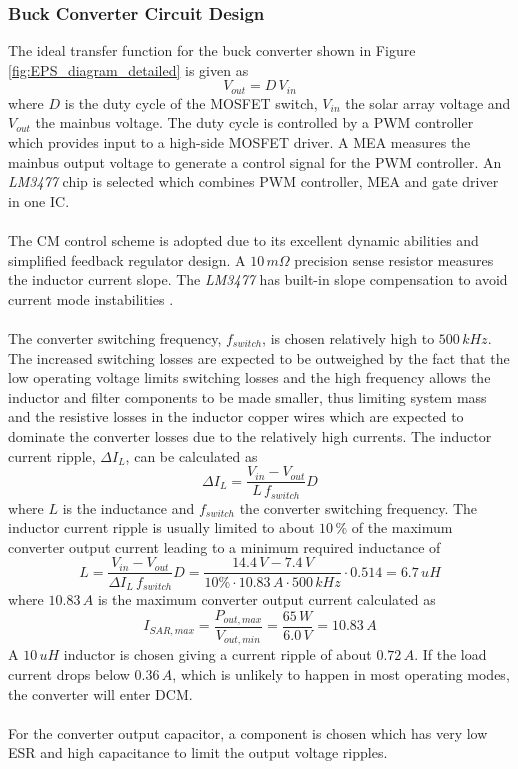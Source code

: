 \subsubsection{Buck Converter Circuit Design}
The ideal transfer function for the buck converter shown in Figure \ref{fig:EPS_diagram_detailed} is given as
%
\begin{equation}
V_{out}=D\,V_{in}
\end{equation}
%
where $D$ is the duty cycle of the \ac{MOSFET} switch, $V_{in}$ the solar array voltage and $V_{out}$ the mainbus voltage. The duty cycle is controlled by a \ac{PWM} controller which provides input to a high-side \ac{MOSFET} driver. A \ac{MEA} measures the mainbus output voltage to generate a control signal for the PWM controller. An \textit{LM3477} chip is selected which combines \ac{PWM} controller, \ac{MEA} and gate driver in one \ac{IC}.
\\
\\
The \ac{CM} control scheme is adopted due to its excellent dynamic abilities \cite[sec. 12-3-6]{Fundamentals} and simplified feedback regulator design. A $10\,m \Omega$ precision sense resistor measures the inductor current slope. The \textit{LM3477} has built-in slope compensation to avoid current mode instabilities \cite[sec. 12-1]{Fundamentals}.
\\
\\
The converter switching frequency, $f_{switch}$, is chosen relatively high to $500\,kHz$. The increased switching losses are expected to be outweighed by the fact that the low operating voltage limits switching losses and the high frequency allows the inductor and filter components to be made smaller, thus limiting system mass and the resistive losses in the inductor copper wires which are expected to dominate the converter losses due to the relatively high currents. The inductor current ripple, $\Delta I_L$, can be calculated as 
%
\begin{equation}
\Delta I_L=\dfrac{V_{in}-V_{out}}{L\,f_{switch}}D
\end{equation}
%
where $L$ is the inductance and $f_{switch}$ the converter switching frequency. 
The inductor current ripple is usually limited to about $10\,\%$ of the maximum converter output current leading to a minimum required inductance of
%
\begin{equation}
L=\dfrac{V_{in}-V_{out}}{\Delta I_L\,f_{switch}}D=\dfrac{14.4\,V-7.4\,V}{10\% \cdot 10.83\,A\cdot 500\,kHz}\cdot 0.514=6.7\,uH
\end{equation}
%
where $10.83\,A$ is the maximum converter output current calculated as 
%
\begin{equation}
I_{SAR,max}=\dfrac{P_{out,max}}{V_{out,min}}=\dfrac{65\,W}{6.0\,V}=10.83\,A
\end{equation}
%
A $10\,uH$ inductor is chosen giving a current ripple of about $0.72\,A$. If the load current drops below $0.36\,A$, which is unlikely to happen in most operating modes, the converter will enter \ac{DCM}.
\\
\\
For the converter output capacitor, a component is chosen which has very low \ac{ESR} and high capacitance to limit the output voltage ripples.
%
